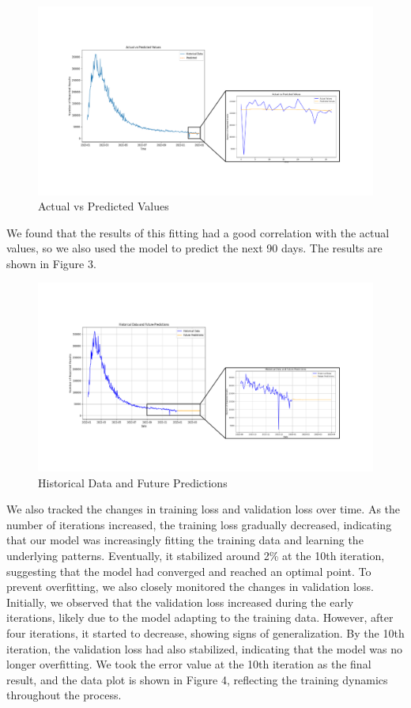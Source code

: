 \documentclass{mcmthesis}  %
\begin{document}
\begin{figure}[h]  %
        \small
        \centering  %
        \includegraphics[width=18cm]{figure/F2.pdf}  %
        \caption{Actual vs Predicted Values} \label{Figure2}  %
\end{figure}  %
We found that the results of this 
fitting had a good correlation with the actual values, so we also used the model to predict the next 90 days. 
The results are shown in Figure 3.
\begin{figure}[h]  %
        \small
        \centering  %
        \includegraphics[width=18cm]{figure/F3.pdf}  %
        \caption{Historical Data and Future Predictions} \label{Figure2}  %
\end{figure}  %


We also tracked the changes in training loss and validation loss over time. As the number of iterations increased, 
the training loss gradually decreased, indicating that our model was increasingly fitting the training data and 
learning the underlying patterns. Eventually, it stabilized around 2\% at the 10th iteration, suggesting that the 
model had converged and reached an optimal point. To prevent overfitting, we also closely monitored the changes 
in validation loss. Initially, we observed that the validation loss increased during the early iterations, likely 
due to the model adapting to the training data. However, after four iterations, it started to decrease, showing 
signs of generalization. By the 10th iteration, the validation loss had also stabilized, indicating that the model 
was no longer overfitting. We took the error value at the 10th iteration as the final result, and the data plot is 
shown in Figure 4, reflecting the training dynamics throughout the process.
\end{document}
